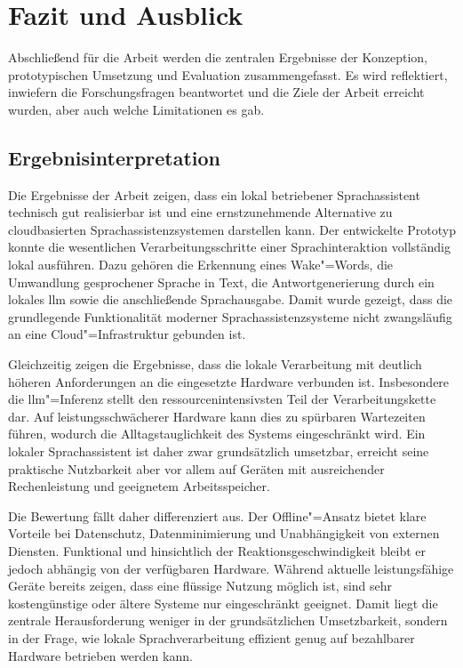 \chapter{Fazit und Ausblick}
\label{chap:Fazit_und_Ausblick}
Abschließend für die Arbeit werden die zentralen Ergebnisse der Konzeption, prototypischen Umsetzung und Evaluation zusammengefasst. Es wird reflektiert, inwiefern die Forschungsfragen beantwortet und die Ziele der Arbeit erreicht wurden, aber auch welche Limitationen es gab.


\section{Ergebnisinterpretation}
\label{sec:Ergebnisinterpretation}
Die Ergebnisse der Arbeit zeigen, dass ein lokal betriebener Sprachassistent technisch gut realisierbar ist und eine ernstzunehmende Alternative zu cloudbasierten Sprachassistenzsystemen darstellen kann. Der entwickelte Prototyp konnte die wesentlichen Verarbeitungsschritte einer Sprachinteraktion vollständig lokal ausführen. Dazu gehören die Erkennung eines Wake"=Words, die Umwandlung gesprochener Sprache in Text, die Antwortgenerierung durch ein lokales \gls{llm} sowie die anschließende Sprachausgabe. Damit wurde gezeigt, dass die grundlegende Funktionalität moderner Sprachassistenzsysteme nicht zwangsläufig an eine Cloud"=Infrastruktur gebunden ist.

Gleichzeitig zeigen die Ergebnisse, dass die lokale Verarbeitung mit deutlich höheren Anforderungen an die eingesetzte Hardware verbunden ist. Insbesondere die \gls{llm}"=Inferenz stellt den ressourcenintensivsten Teil der Verarbeitungskette dar. Auf leistungsschwächerer Hardware kann dies zu spürbaren Wartezeiten führen, wodurch die Alltagstauglichkeit des Systems eingeschränkt wird. Ein lokaler Sprachassistent ist daher zwar grundsätzlich umsetzbar, erreicht seine praktische Nutzbarkeit aber vor allem auf Geräten mit ausreichender Rechenleistung und geeignetem Arbeitsspeicher.

Die Bewertung fällt daher differenziert aus. Der Offline"=Ansatz bietet klare Vorteile bei Datenschutz, Datenminimierung und Unabhängigkeit von externen Diensten. Funktional und hinsichtlich der Reaktionsgeschwindigkeit bleibt er jedoch abhängig von der verfügbaren Hardware. Während aktuelle leistungsfähige Geräte bereits zeigen, dass eine flüssige Nutzung möglich ist, sind sehr kostengünstige oder ältere Systeme nur eingeschränkt geeignet. Damit liegt die zentrale Herausforderung weniger in der grundsätzlichen Umsetzbarkeit, sondern in der Frage, wie lokale Sprachverarbeitung effizient genug auf bezahlbarer Hardware betrieben werden kann.

